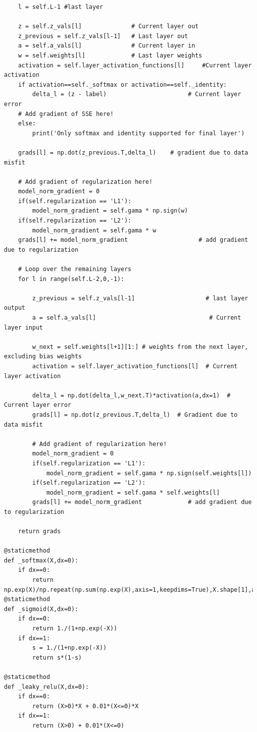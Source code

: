 \documentclass[12pt]{article}
\begin{document}
\begin{flushleft}
\begin{lstlisting}
	l = self.L-1 #last layer

	z = self.z_vals[l]              # Current layer out
	z_previous = self.z_vals[l-1]   # Last layer out
	a = self.a_vals[l]              # Current layer in
	w = self.weights[l]             # Last layer weights
	activation = self.layer_activation_functions[l]     #Current layer activation
	if activation==self._softmax or activation==self._identity:
		delta_l = (z - label)                       # Current layer error
	# Add gradient of SSE here!
	else:
		print('Only softmax and identity supported for final layer') 

	grads[l] = np.dot(z_previous.T,delta_l)    # gradient due to data misfit

	# Add gradient of regularization here!
	model_norm_gradient = 0
	if(self.regularization == 'L1'):
		model_norm_gradient = self.gama * np.sign(w)
	if(self.regularization == 'L2'):
		model_norm_gradient = self.gama * w
	grads[l] += model_norm_gradient                    # add gradient due to regularization
	
	# Loop over the remaining layers
	for l in range(self.L-2,0,-1):
	
		z_previous = self.z_vals[l-1]                    # last layer output
		a = self.a_vals[l]                                # Current layer input
		
		w_next = self.weights[l+1][1:] # weights from the next layer, excluding bias weights
		activation = self.layer_activation_functions[l]  # Current layer activation
		
		delta_l = np.dot(delta_l,w_next.T)*activation(a,dx=1)  # Current layer error
		grads[l] = np.dot(z_previous.T,delta_l)  # Gradient due to data misfit
		
		# Add gradient of regularization here!
		model_norm_gradient = 0
		if(self.regularization == 'L1'):
			model_norm_gradient = self.gama * np.sign(self.weights[l])
		if(self.regularization == 'L2'):
			model_norm_gradient = self.gama * self.weights[l]
		grads[l] += model_norm_gradient             # add gradient due to regularization
	
	return grads

@staticmethod
def _softmax(X,dx=0):
	if dx==0:
		return np.exp(X)/np.repeat(np.sum(np.exp(X),axis=1,keepdims=True),X.shape[1],axis=1)
@staticmethod
def _sigmoid(X,dx=0):
	if dx==0:
		return 1./(1+np.exp(-X))
	if dx==1:
		s = 1./(1+np.exp(-X))
		return s*(1-s)

@staticmethod
def _leaky_relu(X,dx=0):
	if dx==0:
		return (X>0)*X + 0.01*(X<=0)*X
	if dx==1:
		return (X>0) + 0.01*(X<=0)


\end{lstlisting}
\end{flushleft}
\end{document}
